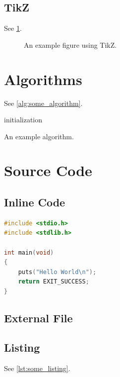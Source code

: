 \subsection{TikZ}

See \cref{fig:tikz_figure}.

\begin{figure}
	\centering
	
	\caption{An example figure using TikZ.}
	\label{fig:tikz_figure}
\end{figure}

\section{Algorithms}

See \cref{alg:some_algorithm}.

\begin{algorithm}
	\capstart
	\BlankLine
	initialization\;
	\caption{An example algorithm.}
	\label{alg:some_algorithm}
\end{algorithm}

\section{Source Code}

\subsection{Inline Code}

\begin{lstlisting}[language=c]
#include <stdio.h>
#include <stdlib.h>

int main(void)
{
	puts("Hello World\n");
	return EXIT_SUCCESS;
}
\end{lstlisting}

\subsection{External File}



\subsection{Listing}

See \cref{lst:some_listing}.

